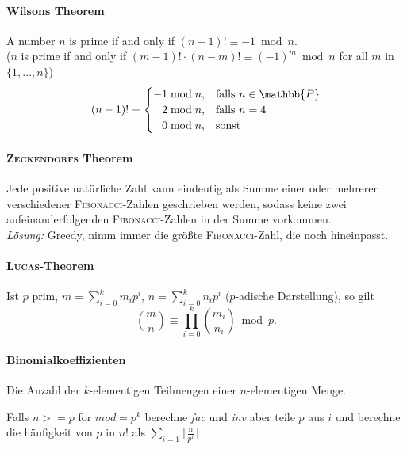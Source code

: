 \paragraph{Wilsons Theorem}
A number $n$ is prime if and only if
$(n-1)!\equiv -1\bmod{n}$.\\
($n$ is prime if and only if $(m-1)!\cdot(n-m)!\equiv(-1)^m\bmod{n}$ for all $m$ in $\{1,\dots,n\}$)
\begin{align*}
	(n-1)!\equiv\begin{cases}
		-1\bmod{n},&\mathrm{falls}~n \in \mathbb{P}\\
		\hphantom{-}2\bmod{n},&\mathrm{falls}~n = 4\\
		\hphantom{-}0\bmod{n},&\mathrm{sonst}
	\end{cases}
\end{align*}

\paragraph{\textsc{Zeckendorfs} Theorem}
Jede positive natürliche Zahl kann eindeutig als Summe einer oder mehrerer
verschiedener \textsc{Fibonacci}-Zahlen geschrieben werden, sodass keine zwei
aufeinanderfolgenden \textsc{Fibonacci}-Zahlen in der Summe vorkommen.\\
\emph{Lösung:} Greedy, nimm immer die größte \textsc{Fibonacci}-Zahl, die noch
hineinpasst.

\paragraph{\textsc{Lucas}-Theorem}
Ist $p$ prim, $m=\sum_{i=0}^km_ip^i$, $n=\sum_{i=0}^kn_ip^i$ ($p$-adische Darstellung),
so gilt
\vspace{-0.75\baselineskip}
\[
	\binom{m}{n} \equiv \prod_{i=0}^k\binom{m_i}{n_i} \bmod{p}.
\]

\paragraph{Binomialkoeffizienten}
	Die Anzahl der \mbox{$k$-elementigen} Teilmengen einer \mbox{$n$-elementigen} Menge.
	
	\begin{methods}
	\end{methods}
	Falls $n >= p$ for $\mathit{mod}=p^k$ berechne \textit{fac} und \textit{inv} aber teile $p$ aus $i$ und berechne die häufigkeit von $p$ in $n!$ als $\sum\limits_{i=1}\big\lfloor\frac{n}{p^i}\big\rfloor$

